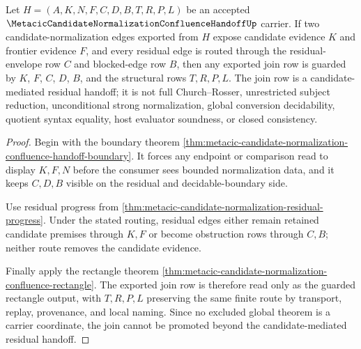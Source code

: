 \begin{theorem}
\label{thm:metacic-candidate-normalization-confluence-handoff-candidate-residual-join}
Let $H=(A,K,N,F,C,D,B,T,R,P,L)$ be an accepted $\MetacicCandidateNormalizationConfluenceHandoffUp$ carrier. If two candidate-normalization edges exported from $H$ expose candidate evidence $K$ and frontier evidence $F$, and every residual edge is routed through the residual-envelope row $C$ and blocked-edge row $B$, then any exported join row is guarded by $K$, $F$, $C$, $D$, $B$, and the structural rows $T,R,P,L$. The join row is a candidate-mediated residual handoff; it is not full Church--Rosser, unrestricted subject reduction, unconditional strong normalization, global conversion decidability, quotient syntax equality, host evaluator soundness, or closed consistency.
\end{theorem}
\begin{proof}
Begin with the boundary theorem \autoref{thm:metacic-candidate-normalization-confluence-handoff-boundary}. It forces any endpoint or comparison read to display $K,F,N$ before the consumer sees bounded normalization data, and it keeps $C,D,B$ visible on the residual and decidable-boundary side.

Use residual progress from \autoref{thm:metacic-candidate-normalization-residual-progress}. Under the stated routing, residual edges either remain retained candidate premises through $K,F$ or become obstruction rows through $C,B$; neither route removes the candidate evidence.

Finally apply the rectangle theorem \autoref{thm:metacic-candidate-normalization-confluence-rectangle}. The exported join row is therefore read only as the guarded rectangle output, with $T,R,P,L$ preserving the same finite route by transport, replay, provenance, and local naming. Since no excluded global theorem is a carrier coordinate, the join cannot be promoted beyond the candidate-mediated residual handoff.
\end{proof}

